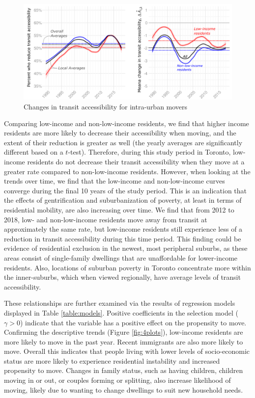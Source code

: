 \begin{figure}[H]
	\centering
	\includegraphics[width=1\linewidth]{figures/2smooth.png}
	\caption{{Changes in transit accessibility for intra-urban movers}}
	\label{fig:2smooth}
\end{figure}

Comparing low-income and non-low-income residents, we find that higher income residents are more likely to decrease their accessibility when moving, and the extent of their reduction is greater as well (the yearly averages are significantly different based on a $t$-test). Therefore, during this study period in Toronto, low-income residents do not decrease their transit accessibility when they move at a greater rate compared to non-low-income residents. However, when looking at the trends over time, we find that the low-income and non-low-income curves converge during the final 10 years of the study period. This is an indication that the effects of gentrification and suburbanization of poverty, at least in terms of residential mobility, are also increasing over time. We find that from 2012 to 2018, low- and non-low-income residents move away from transit at approximately the same rate, but low-income residents still experience less of a reduction in transit accessibility during this time period. This finding could be evidence of residential exclusion in the newest, most peripheral suburbs, as these areas consist of single-family dwellings that are unaffordable for lower-income residents. Also, locations of suburban poverty in Toronto concentrate more within the inner-suburbs, which when viewed regionally, have average levels of transit accessibility. 



These relationships are further examined via the results of regression models displayed in Table \ref{table:models}. Positive coefficients in the selection model ($\gamma > 0$) indicate that the variable has a positive effect on the propensity to move. Confirming the descriptive trends (Figure \ref{fig:4plots}), low-income residents are more likely to move in the past year. Recent immigrants are also more likely to move. Overall this indicates that people living with lower levels of socio-economic status are more likely to experience residential instability and increased propensity to move. Changes in family status, such as having children, children moving in or out, or couples forming or splitting, also increase likelihood of moving, likely due to wanting to change dwellings to suit new household needs.


